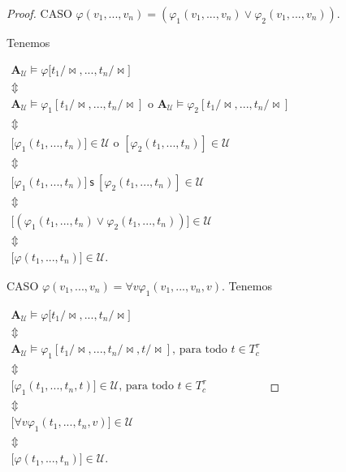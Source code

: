 \begin{proof}
    CASO \(\varphi (v_{1},...,v_{n})=\left( \varphi _{1}(v_{1},...,v_{n})\vee \varphi _{2}(v_{1},...,v_{n})\right) .\)

    Tenemos

    \(\displaystyle \begin{array}{c} \mathbf{A}_{\mathcal{U}}\models \varphi \lbrack t_{1}/\mathrm{\bowtie } ,...,t_{n}/\mathrm{\bowtie }] \\ \Updownarrow \\ \mathbf{A}_{\mathcal{U}}\models \varphi _{1}[t_{1}/\mathrm{\bowtie } ,...,t_{n}/\mathrm{\bowtie }]\text{ o }\mathbf{A}_{\mathcal{U}}\models \varphi _{2}[t_{1}/\mathrm{\bowtie },...,t_{n}/\mathrm{\bowtie }] \\ \Updownarrow \\ \lbrack \varphi _{1}(t_{1},...,t_{n})]\in \mathcal{U}\text{ o }[\varphi _{2}(t_{1},...,t_{n})]\in \mathcal{U} \\ \Updownarrow \\ \lbrack \varphi _{1}(t_{1},...,t_{n})]\ \mathsf{s\ }[\varphi _{2}(t_{1},...,t_{n})]\in \mathcal{U} \\ \Updownarrow \\ \lbrack \left( \varphi _{1}(t_{1},...,t_{n})\vee \varphi _{2}(t_{1},...,t_{n})\right) ]\in \mathcal{U} \\ \Updownarrow \\ \lbrack \varphi (t_{1},...,t_{n})]\in \mathcal{U}. \end{array} \)

    CASO \(\varphi (v_{1},...,v_{n})=\forall v\varphi _{1}(v_{1},...,v_{n},v).\)
    Tenemos

    \(\displaystyle \begin{array}{c} \mathbf{A}_{\mathcal{U}}\models \varphi \lbrack t_{1}/\mathrm{\bowtie } ,...,t_{n}/\mathrm{\bowtie }] \\ \Updownarrow \\ \mathbf{A}_{\mathcal{U}}\models \varphi _{1}[t_{1}/\mathrm{\bowtie } ,...,t_{n}/\mathrm{\bowtie },t/\mathrm{\bowtie }]\text{, para todo }t\in T_{c}^{\tau } \\ \Updownarrow \\ \lbrack \varphi _{1}(t_{1},...,t_{n},t)]\in \mathcal{U}\text{, para todo } t\in T_{c}^{\tau } \\ \Updownarrow \\ \lbrack \forall v\varphi _{1}(t_{1},...,t_{n},v)]\in \mathcal{U} \\ \Updownarrow \\ \lbrack \varphi (t_{1},...,t_{n})]\in \mathcal{U}. \end{array} \)


\end{proof}
